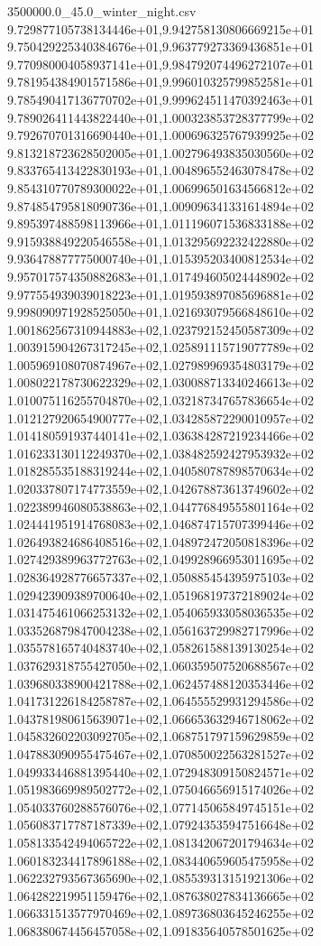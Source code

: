 \begin{filecontents*}{3500000.0_45.0_winter_night.csv}
9.729877105738134446e+01,9.942758130806669215e+01
9.750429225340384676e+01,9.963779273369436851e+01
9.770980004058937141e+01,9.984792074496272107e+01
9.781954384901571586e+01,9.996010325799852581e+01
9.785490417136770702e+01,9.999624511470392463e+01
9.789026411443822440e+01,1.000323853728377799e+02
9.792670701316690440e+01,1.000696325767939925e+02
9.813218723628502005e+01,1.002796493835030560e+02
9.833765413422830193e+01,1.004896552463078478e+02
9.854310770789300022e+01,1.006996501634566812e+02
9.874854795818090736e+01,1.009096341331614894e+02
9.895397488598113966e+01,1.011196071536833188e+02
9.915938849220546558e+01,1.013295692232422880e+02
9.936478877775000740e+01,1.015395203400812534e+02
9.957017574350882683e+01,1.017494605024448902e+02
9.977554939039018223e+01,1.019593897085696881e+02
9.998090971928525050e+01,1.021693079566848610e+02
1.001862567310944883e+02,1.023792152450587309e+02
1.003915904267317245e+02,1.025891115719077789e+02
1.005969108070874967e+02,1.027989969354803179e+02
1.008022178730622329e+02,1.030088713340246613e+02
1.010075116255704870e+02,1.032187347657836654e+02
1.012127920654900777e+02,1.034285872290010957e+02
1.014180591937440141e+02,1.036384287219234466e+02
1.016233130112249370e+02,1.038482592427953932e+02
1.018285535188319244e+02,1.040580787898570634e+02
1.020337807174773559e+02,1.042678873613749602e+02
1.022389946080538863e+02,1.044776849555801164e+02
1.024441951914768083e+02,1.046874715707399446e+02
1.026493824686408516e+02,1.048972472050818396e+02
1.027429389963772763e+02,1.049928966953011695e+02
1.028364928776657337e+02,1.050885454395975103e+02
1.029423909389700640e+02,1.051968197372189024e+02
1.031475461066253132e+02,1.054065933058036535e+02
1.033526879847004238e+02,1.056163729982717996e+02
1.035578165740483740e+02,1.058261588139130254e+02
1.037629318755427050e+02,1.060359507520688567e+02
1.039680338900421788e+02,1.062457488120353446e+02
1.041731226184258787e+02,1.064555529931294586e+02
1.043781980615639071e+02,1.066653632946718062e+02
1.045832602203092705e+02,1.068751797159629859e+02
1.047883090955475467e+02,1.070850022563281527e+02
1.049933446881395440e+02,1.072948309150824571e+02
1.051983669989502772e+02,1.075046656915174026e+02
1.054033760288576076e+02,1.077145065849745151e+02
1.056083717787187339e+02,1.079243535947516648e+02
1.058133542494065722e+02,1.081342067201794634e+02
1.060183234417896188e+02,1.083440659605475958e+02
1.062232793567365690e+02,1.085539313151921306e+02
1.064282219951159476e+02,1.087638027834136665e+02
1.066331513577970469e+02,1.089736803645246255e+02
1.068380674456457058e+02,1.091835640578501625e+02

\end{filecontents*}
